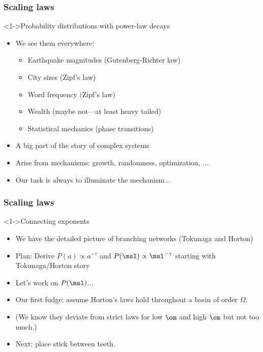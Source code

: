 \begin{frame}[label=]
  \frametitle{Scaling laws}

  \begin{block}<1->{Probability distributions with power-law decays}
    \begin{itemize}
    \item<2-> We see them everywhere:
      \begin{itemize}
      \item<3-> Earthquake magnitudes (Gutenberg-Richter law)
      \item<4-> City sizes (Zipf's law)
      \item<5-> Word frequency (Zipf's law)\cite{zipf1949a}
      \item<6-> Wealth (maybe not---at least heavy tailed)
      \item<7-> Statistical mechanics (phase transitions)\cite{goldenfeld1992a}
      \end{itemize}
    \item<8-> A big part of the story of complex systems
    \item<9-> Arise from \alert{mechanisms}: growth, randomness, optimization, ...
    \item<10-> Our task is always to illuminate the mechanism...
    \end{itemize}
  \end{block}
\end{frame}

\begin{frame}[label=]
  \frametitle{Scaling laws}

  \begin{block}<1->{Connecting exponents}
    \begin{itemize}
    \item<2-> We have the detailed picture of branching networks (Tokunaga and
      Horton)
    \item<3-> Plan: Derive $P(a) \propto a^{-\tau}$ and $P(\msl) \propto \msl^{-\gamma}$
      starting with Tokunaga/Horton story\cite{tarboton1990a,devries1994a,dodds1999a}
    \item<4-> Let's work on $P(\msl)$...
    \item<5-> Our first fudge: assume Horton's laws hold throughout a basin of
      order $\Omega$.
    \item<6-> (We know they deviate from strict laws for low $\om$ and high $\om$
      but not too much.)
    \item<7-> Next: place stick between teeth.  
    \end{itemize}
  \end{block}
\end{frame}

